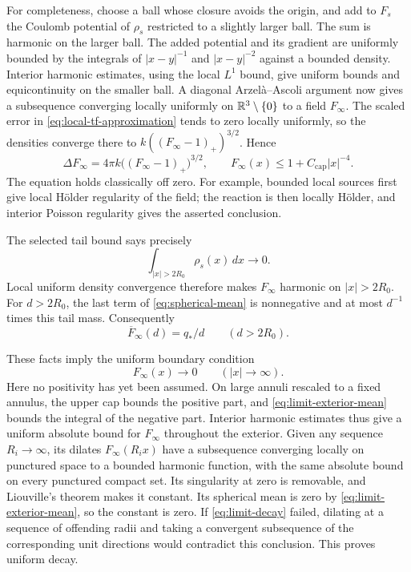 For completeness, choose a ball whose closure avoids the origin,
and add to $F_s$ the Coulomb potential of $\rho_s$ restricted to a
slightly larger ball.  The sum is harmonic on the larger ball.
The added potential and its gradient are uniformly bounded by the
integrals of $|x-y|^{-1}$ and $|x-y|^{-2}$ against a bounded density.
Interior harmonic estimates, using the local $L^1$ bound, give
uniform bounds and equicontinuity on the smaller ball.  A diagonal
Arzel\`a--Ascoli argument now gives a subsequence converging locally
uniformly on $\mathbb R^3\setminus\{0\}$ to a field $F_\infty$.
The scaled error in \cref{eq:local-tf-approximation} tends to zero
locally uniformly, so the densities converge there to
$k((F_\infty-1)_+)^{3/2}$.  Hence
\begin{equation}\label{eq:limit-pde}
 \Delta F_\infty=4\pi k\bigl((F_\infty-1)_+\bigr)^{3/2},
 \qquad
 F_\infty(x)\le1+C_{\mathrm{cap}}|x|^{-4}.
\end{equation}
The equation holds classically off zero.  For example, bounded
local sources first give local H\"older regularity of the field;
the reaction is then locally H\"older, and interior Poisson
regularity gives the asserted conclusion.

The selected tail bound says precisely
\[
 \int_{|x|>2R_0}\rho_s(x)\,dx\longrightarrow0.
\]
Local uniform density convergence therefore makes $F_\infty$
harmonic on $|x|>2R_0$.  For $d>2R_0$, the last term of
\cref{eq:spherical-mean} is nonnegative and at most $d^{-1}$ times
this tail mass.  Consequently
\begin{equation}\label{eq:limit-exterior-mean}
 \overline F_\infty(d)=q_*/d\qquad(d>2R_0).
\end{equation}

These facts imply the uniform boundary condition
\begin{equation}\label{eq:limit-decay}
 F_\infty(x)\longrightarrow0\qquad(|x|\to\infty).
\end{equation}
Here no positivity has yet been assumed.  On large annuli rescaled
to a fixed annulus, the upper cap bounds the positive part, and
\cref{eq:limit-exterior-mean} bounds the integral of the negative
part.  Interior harmonic estimates thus give a uniform absolute
bound for $F_\infty$ throughout the exterior.  Given any sequence
$R_i\to\infty$, its dilates $F_\infty(R_i x)$ have a subsequence
converging locally on punctured space to a bounded harmonic
function, with the same absolute bound on every punctured compact
set.  Its singularity at zero is removable, and Liouville's theorem
makes it constant.  Its spherical mean is zero by
\cref{eq:limit-exterior-mean}, so the constant is zero.  If
\cref{eq:limit-decay} failed, dilating at a sequence of offending
radii and taking a convergent subsequence of the corresponding unit
directions would contradict this conclusion.  This proves uniform
decay.

